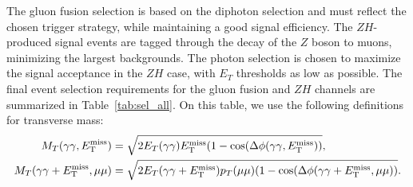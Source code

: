 The gluon fusion selection is based on the diphoton selection and must reflect the chosen trigger strategy, while maintaining a good signal efficiency. 
%
%
%
The $ZH$-produced signal events are tagged through the decay of the $Z$ boson to muons, minimizing the largest backgrounds. 
The photon selection is chosen to maximize the signal acceptance in the $ZH$ case, with $E_{T}$ thresholds as low as possible. 
%
The final event selection requirements for the gluon fusion  and $ZH$ channels are summarized in Table~\ref{tab:sel_all}. On this table, we use the following definitions for transverse mass:
\begin{align}
M_{T}(\gamma\gamma,E_{\mathrm{T}}^{\text{miss}}) &= \sqrt{2E_{T}(\gamma\gamma)E_{\mathrm{T}}^{\text{miss}}(1-\cos(\Delta\phi(\gamma\gamma,E_{\mathrm{T}}^{\text{miss}}))}, \\
M_{T}(\gamma\gamma+E_{\mathrm{T}}^{\text{miss}}, \mu\mu) &= \sqrt{2E_{T}(\gamma\gamma+E_{\mathrm{T}}^{\text{miss}})p_{T}(\mu\mu)(1-\cos(\Delta\phi(\gamma\gamma+E_{\mathrm{T}}^{\text{miss}},\mu\mu))}.
\end{align}

